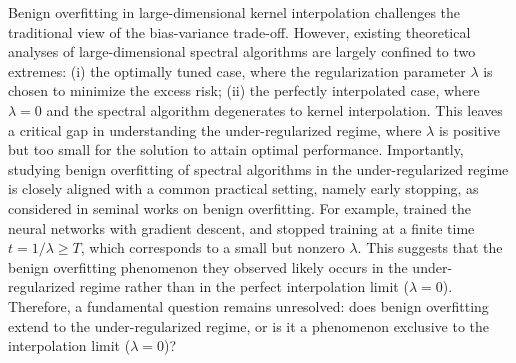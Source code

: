 \documentclass{article}
\theoremstyle{plain}
\theoremstyle{definition}
\theoremstyle{remark}
\begin{document}
Benign overfitting in large-dimensional kernel interpolation challenges the traditional view of the bias-variance trade-off. 
However, existing theoretical analyses of large-dimensional spectral algorithms are largely confined to two extremes: 
(i) the optimally tuned case, where the regularization parameter $\lambda$ is chosen to minimize the excess risk;
(ii) the perfectly interpolated case, where $\lambda=0$ and the spectral algorithm degenerates to kernel interpolation.
This leaves a critical gap in understanding the under-regularized regime, where $\lambda$ is positive but too small for the solution to attain optimal performance.
Importantly, studying benign overfitting of spectral algorithms in the under-regularized regime is closely aligned with a common practical setting, namely early stopping, as considered in seminal works on benign overfitting. 
For example, \cite{zhang2016understanding} trained the neural networks with gradient descent, and stopped training at a finite time $t=1/\lambda \geq T$, which corresponds to a small but nonzero $\lambda$.
This suggests that the benign overfitting phenomenon they observed likely occurs in the under-regularized regime rather than in the perfect interpolation limit ($\lambda=0$).
Therefore, a fundamental question remains unresolved: does benign overfitting extend to the under-regularized regime, or is it a phenomenon exclusive to the interpolation limit ($\lambda=0$)?







\end{document}
